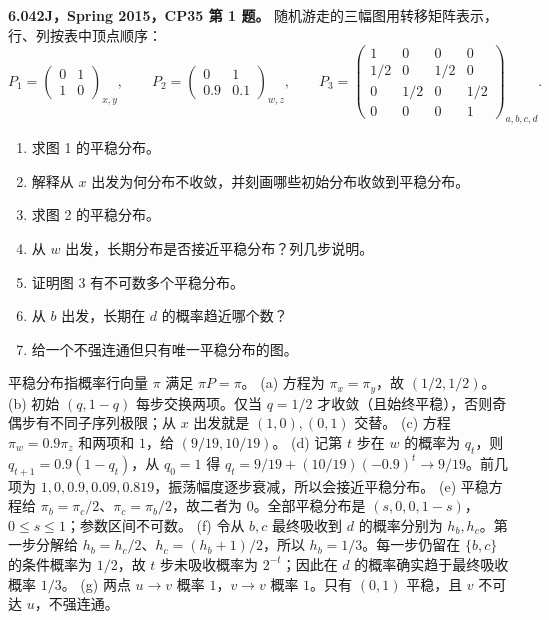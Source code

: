 \begin{exercise}\label{mit:6042-cp35-q1}
\textbf{6.042J，Spring 2015，CP35 第 1 题。}
随机游走的三幅图用转移矩阵表示，行、列按表中顶点顺序：
\[
P_1=\begin{pmatrix}0&1\\1&0\end{pmatrix}_{x,y},\qquad
P_2=\begin{pmatrix}0&1\\0.9&0.1\end{pmatrix}_{w,z},\qquad
P_3=\begin{pmatrix}1&0&0&0\\1/2&0&1/2&0\\0&1/2&0&1/2\\0&0&0&1\end{pmatrix}_{a,b,c,d}.
\]
\begin{enumerate}[label=(\alph*)]
\item 求图 1 的平稳分布。
\item 解释从 $x$ 出发为何分布不收敛，并刻画哪些初始分布收敛到平稳分布。
\item 求图 2 的平稳分布。
\item 从 $w$ 出发，长期分布是否接近平稳分布？列几步说明。
\item 证明图 3 有不可数多个平稳分布。
\item 从 $b$ 出发，长期在 $d$ 的概率趋近哪个数？
\item 给一个不强连通但只有唯一平稳分布的图。
\end{enumerate}
\end{exercise}
\begin{solution}
平稳分布指概率行向量 $\pi$ 满足 $\pi P=\pi$。
(a) 方程为 $\pi_x=\pi_y$，故 $(1/2,1/2)$。
(b) 初始 $(q,1-q)$ 每步交换两项。仅当 $q=1/2$ 才收敛（且始终平稳），否则奇偶步有不同子序列极限；从 $x$ 出发就是 $(1,0),(0,1)$ 交替。
(c) 方程 $\pi_w=0.9\pi_z$ 和两项和 $1$，给 $(9/19,10/19)$。
(d) 记第 $t$ 步在 $w$ 的概率为 $q_t$，则 $q_{t+1}=0.9(1-q_t)$，从 $q_0=1$ 得
$q_t=9/19+(10/19)(-0.9)^t\to9/19$。前几项为 $1,0,0.9,0.09,0.819$，振荡幅度逐步衰减，所以会接近平稳分布。
(e) 平稳方程给 $\pi_b=\pi_c/2$、$\pi_c=\pi_b/2$，故二者为 $0$。全部平稳分布是 $(s,0,0,1-s)$，$0\le s\le1$；参数区间不可数。
(f) 令从 $b,c$ 最终吸收到 $d$ 的概率分别为 $h_b,h_c$。第一步分解给 $h_b=h_c/2$、$h_c=(h_b+1)/2$，所以 $h_b=1/3$。每一步仍留在 $\{b,c\}$ 的条件概率为 $1/2$，故 $t$ 步未吸收概率为 $2^{-t}$；因此在 $d$ 的概率确实趋于最终吸收概率 $1/3$。
(g) 两点 $u\to v$ 概率 $1$，$v\to v$ 概率 $1$。只有 $(0,1)$ 平稳，且 $v$ 不可达 $u$，不强连通。
\end{solution}

